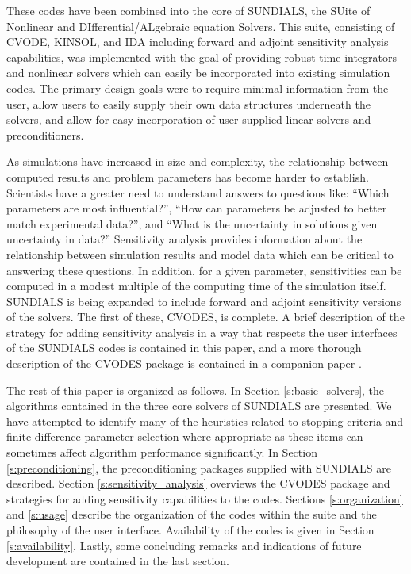 These codes have been combined into the core of SUNDIALS, the  
SUite of Nonlinear and DIfferential/ALgebraic equation Solvers.  
This suite, consisting of CVODE, KINSOL, and IDA including 
forward and adjoint sensitivity 
analysis capabilities, was implemented with the goal of providing
robust time integrators and nonlinear solvers which can easily be 
incorporated into existing simulation codes.  The primary design 
goals were to require minimal information from the user, allow users 
to easily supply their own data structures underneath the solvers, 
and allow for easy incorporation of user-supplied linear solvers
and preconditioners.

As simulations have increased in size and complexity, the 
relationship between computed results and problem parameters has 
become harder to establish.  Scientists have a greater need to
understand answers to questions like: ``Which parameters are 
most influential?'', ``How can parameters be adjusted to better 
match experimental data?'', and ``What is the uncertainty in solutions 
given uncertainty in data?''  Sensitivity analysis provides 
information about the relationship between simulation results and model 
data which can be critical to answering these questions.  In addition, for 
a given parameter, sensitivities can be computed in a modest multiple of 
the computing time of the simulation itself.  
SUNDIALS is being expanded to 
include forward and adjoint sensitivity versions of the solvers.
The first of these, CVODES, is complete.  A brief description of the
strategy for adding sensitivity analysis in a way that respects the
user interfaces of the SUNDIALS codes is contained in this paper, and 
a more thorough description of the CVODES package is contained in a 
companion paper \cite{SeHi:03}.

The rest of this paper is organized as follows.  In Section 
\ref{s:basic_solvers}, the algorithms contained in the three 
core solvers of SUNDIALS are presented.  
We have attempted to identify many of the heuristics related to 
stopping criteria and finite-difference parameter selection
where appropriate as these items 
can sometimes affect algorithm performance significantly.
In Section \ref{s:preconditioning}, the
preconditioning packages supplied with SUNDIALS are
described.  Section \ref{s:sensitivity_analysis} overviews
the CVODES package and strategies for adding sensitivity 
capabilities to the codes.  Sections \ref{s:organization} and 
\ref{s:usage} describe the organization of the codes within the 
suite and the philosophy of the user interface.   
Availability of the codes is given in 
Section \ref{s:availability}.  Lastly, some
concluding remarks and indications of future development
are contained in the last section.



